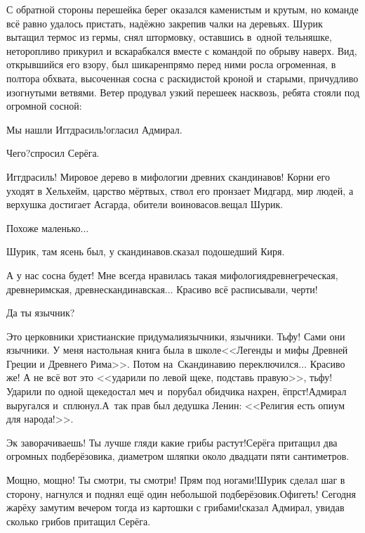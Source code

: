 С обратной стороны перешейка берег оказался каменистым и крутым, но команде всё равно удалось пристать, надёжно закрепив чалки на деревьях. Шурик вытащил термос из гермы, снял штормовку, оставшись в~одной тельняшке, неторопливо прикурил и вскарабкался вместе с командой по обрыву наверх. Вид, открывшийся его взору, был шикарен\mdash прямо перед ними росла огроменная, в полтора обхвата, высоченная сосна с раскидистой кроной и~старыми, причудливо изогнутыми ветвями. Ветер продувал узкий перешеек насквозь, ребята стояли под огромной сосной:

\diagdash Мы нашли Иггдрасиль!\mdash огласил Адмирал.

\diagdash Чего?\mdash спросил Серёга.

\diagdash Иггдрасиль! Мировое дерево в мифологии древних скандинавов! Корни его уходят в Хельхейм, царство мёртвых, ствол его пронзает Мидгард, мир людей, а верхушка достигает Асгарда, обители воинов\sdash асов.\mdash вещал Шурик. 

\diagdash Похоже маленько$\ldots$

\diagdash Шурик, там ясень был, у скандинавов.\mdash сказал подошедший Киря.

\diagdash А у нас сосна будет! Мне всегда нравилась такая мифология\mdash древнегреческая, древнеримская, древнескандинавская$\ldots$ Красиво всё расписывали, черти!

\diagdash Да ты язычник?

\diagdash Это церковники христианские придумали\mdash язычники, язычники. Тьфу! Сами они язычники. У меня настольная книга была в школе\mdash <<Легенды и мифы Древней Греции и Древнего Рима>>\cite{Кун}. Потом на~Скандинавию переключился$\ldots$ Красиво же! А не всё вот это <<ударили по левой щеке, подставь правую>>, тьфу! Ударили по одной щеке\mdash достал меч и~порубал обидчика нахрен, ёпрст!\mdash Адмирал выругался и~сплюнул.\mdash А~так прав был дедушка Ленин: <<Религия есть  опиум для народа!>>\cite{ЛенинОпиумДляНарода}. 

\diagdash Эк заворачиваешь! Ты лучше гляди какие грибы растут!\mdash Серёга притащил два огромных подберёзовика, диаметром шляпки около двадцати пяти сантиметров.  

\diagdash Мощно, мощно! Ты смотри, ты смотри! Прям под ногами!\mdash Шурик сделал шаг в сторону, нагнулся и поднял ещё один небольшой подберёзовик.\mdash Офигеть! Сегодня жарёху замутим вечером тогда из картошки с грибами!\mdash сказал Адмирал, увидав сколько грибов притащил Серёга. 

